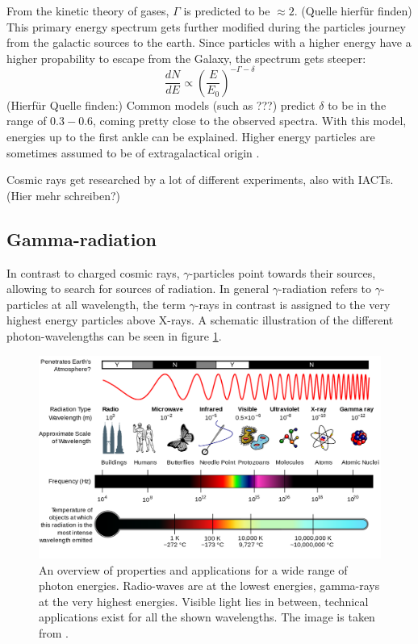 From the kinetic theory of gases, $\Gamma$ is predicted to 
be $\approx 2$.
(Quelle hierfür finden)
This primary energy spectrum gets further modified during the particles 
journey from the galactic sources to the earth.
Since particles with a higher energy have a higher propability to escape 
from the Galaxy, the spectrum gets steeper:
\begin{equation}
	\frac{dN}{dE} \propto \left(\frac{E}{E_0}\right)^{-\Gamma-\delta}
\end{equation}
(Hierfür Quelle finden:)
Common models (such as ???) predict $\delta$ to be in the range of 
$0.3-0.6$, coming pretty close to the observed spectra.
With this model, energies up to the first ankle can be explained.
Higher energy particles are sometimes assumed to be of extragalactical origin
\cite{Baring:1997ka}.

Cosmic rays get researched by a lot of different experiments,
also with IACTs. 
(Hier mehr schreiben?)


\subsection{Gamma-radiation}
In contrast to charged cosmic rays, $\gamma$-particles point towards
their sources, allowing to search for sources of radiation.
In general $\gamma$-radiation refers to $\gamma$-particles at all wavelength,
the term $\gamma$-rays in contrast is assigned to the very highest energy particles
above X-rays.
A schematic illustration of the different photon-wavelengths
can be seen in figure \ref{fig:em_spectrum}.

\begin{figure}
	\centering
	\includegraphics[width=.8\textwidth]{images/em_spectrum.png}
	\caption{An overview of properties and applications for a wide 
		range of photon energies.
		Radio-waves are at the lowest energies, gamma-rays 
		at the very highest energies.
		Visible light lies in between, technical 
		applications exist for all the shown wavelengths.
		The image is taken from \cite{wiki_em}.}
	\label{fig:em_spectrum}
\end{figure}

